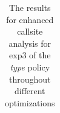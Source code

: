 \begin{table}[!htbp]
{\begin{tabular}{l|c|c|c}
    	\end{tabular}

%
%	
%
%
%
%	
%	
%	
%
%
%
}
		\caption {The results for enhanced callsite analysis for exp3 of the \textit{type} policy throughout different optimizations}
		\label{tbl:CSexp34TYPE}
\end{table}
\newpage
\newpage

